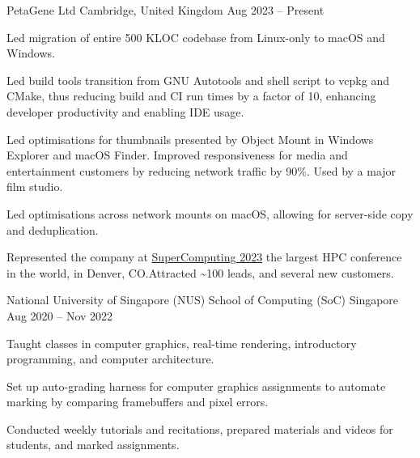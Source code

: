 \begin{cventries}
	{PetaGene Ltd} %
	{Cambridge, United Kingdom} %
	{Aug 2023 -- Present} %
	{
		\vspace{4mm}
		\begin{cvitems} %
			\item Led migration of entire 500 KLOC codebase from Linux-only to macOS and Windows.
			\item Led build tools transition from GNU Autotools and shell script to vcpkg and CMake, thus reducing build and CI run times by a factor of 10, enhancing developer productivity and enabling IDE usage.
			\item Led optimisations for thumbnails presented by Object Mount in Windows Explorer and macOS Finder. Improved responsiveness for media and entertainment customers by reducing network traffic by 90\%. Used by a major film studio.
			\item Led optimisations across network mounts on macOS, allowing for server-side copy and deduplication.
			\item Represented the company at \href{https://hallerickson.ungerboeck.com/prod/app85.cshtml?aat=5663535078317a434974474478437845326c2b766b2b4c562b355033396d433556704e2b3065744c5161773d&ExhibitorID=7040}{SuperComputing 2023} the largest HPC conference in the world, in Denver, CO.\@ Attracted \textasciitilde100 leads, and several new customers.
		\end{cvitems}
	}


	{National University of Singapore (NUS) School of Computing (SoC)} %
	{Singapore} %
	{Aug 2020 -- Nov 2022} %
	{
		\begin{cvitems} %
			\item Taught classes in computer graphics, real-time rendering, introductory programming, and computer architecture.
			\item Set up auto-grading harness for computer graphics assignments to automate marking by comparing framebuffers and pixel errors.
			\item Conducted weekly tutorials and recitations, prepared materials and videos for students, and marked assignments.
		\end{cvitems}
	}


\end{cventries}
